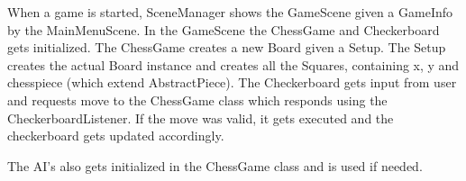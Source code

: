 \documentclass{article}
\begin{document}
When a game is started, SceneManager shows the GameScene given a GameInfo by the MainMenuScene. In the GameScene the ChessGame and Checkerboard gets initialized. The ChessGame creates a new Board given a Setup. The Setup creates the actual Board instance and creates all the Squares, containing x, y and chesspiece (which extend AbstractPiece). The Checkerboard gets input from user and requests move to the ChessGame class which responds using the CheckerboardListener. If the move was valid, it gets executed and the checkerboard gets updated accordingly.

The AI’s also gets initialized in the ChessGame class and is used if needed.
\end{document}
